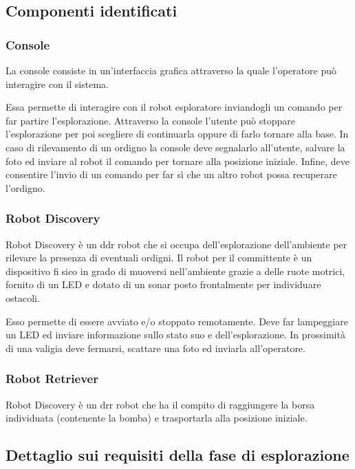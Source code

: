 \subsection{Componenti identificati}

\subsubsection{Console}

La console consiste in un'interfaccia grafica attraverso la quale l'operatore può interagire con il sistema.

Essa permette di interagire con il robot esploratore inviandogli un comando per far partire l'esplorazione.
Attraverso la console l'utente può stoppare l'esplorazione per poi scegliere di continuarla oppure di farlo tornare alla base.
In caso di rilevamento di un ordigno la console deve segnalarlo all'utente, salvare la foto ed inviare al robot il comando per tornare alla posizione iniziale.
Infine, deve consentire l'invio di un comando per far sì che un altro robot possa recuperare l'ordigno.

\subsubsection{Robot Discovery}

Robot Discovery è un ddr robot che si occupa dell'esplorazione dell'ambiente per rilevare la presenza di eventuali ordigni.
Il robot per il committente è un dispositivo fisico in grado di muoversi nell'ambiente grazie a delle ruote motrici, fornito di un LED
e dotato di un sonar posto frontalmente per individuare ostacoli.

Esso permette di essere avviato e/o stoppato remotamente.
Deve far lampeggiare un LED ed inviare informazione sullo stato suo e dell'esplorazione.
In prossimità di una valigia deve fermarsi, scattare una foto ed inviarla all'operatore.

\subsubsection{Robot Retriever}

Robot Discovery è un drr robot che ha il compito di raggiungere la borsa individuata (contenente la bomba) e trasportarla alla posizione iniziale.

\subsection{Dettaglio sui requisiti della fase di esplorazione}

